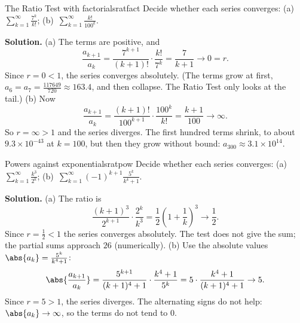 \documentclass[11pt]{article}
\begin{document}
\begin{exmp}{The Ratio Test with factorials}{ratfact}
Decide whether each series converges: (a)~$\displaystyle\sum_{k=1}^\infty\frac{7^k}{k!}$; \quad (b)~$\displaystyle\sum_{k=1}^\infty\frac{k!}{100^k}$.

\textbf{Solution.} (a) The terms are positive, and
\[
\frac{a_{k+1}}{a_k}=\frac{7^{k+1}}{(k+1)!}\cdot\frac{k!}{7^k}=\frac7{k+1}\to0=r .
\]
Since $r=0<1$, the series converges absolutely. (The terms grow at first, $a_6=a_7=\frac{117649}{720}\approx163.4$, and then collapse. The Ratio Test only looks at the tail.)
(b) Now
\[
\frac{a_{k+1}}{a_k}=\frac{(k+1)!}{100^{k+1}}\cdot\frac{100^k}{k!}=\frac{k+1}{100}\to\infty .
\]
So $r=\infty>1$ and the series diverges. The first hundred terms shrink, to about $9.3\times10^{-43}$ at $k=100$, but then they grow without bound: $a_{300}\approx3.1\times10^{14}$.
\end{exmp}

\begin{exmp}{Powers against exponentials}{ratpow}
Decide whether each series converges: (a)~$\displaystyle\sum_{k=1}^\infty\frac{k^3}{2^k}$; \quad (b)~$\displaystyle\sum_{k=1}^\infty(-1)^{k+1}\frac{5^k}{k^4+1}$.

\textbf{Solution.} (a) The ratio is
\[
\frac{(k+1)^3}{2^{k+1}}\cdot\frac{2^k}{k^3}=\frac12\left(1+\frac1k\right)^3\to\frac12 .
\]
Since $r=\frac12<1$ the series converges absolutely. The test does not give the sum; the partial sums approach $26$ (numerically).
(b) Use the absolute values $\abs{a_k}=\frac{5^k}{k^4+1}$:
\[
\abs{\frac{a_{k+1}}{a_k}}=\frac{5^{k+1}}{(k+1)^4+1}\cdot\frac{k^4+1}{5^k}=5\cdot\frac{k^4+1}{(k+1)^4+1}\to5 .
\]
Since $r=5>1$, the series diverges. The alternating signs do not help: $\abs{a_k}\to\infty$, so the terms do not tend to $0$.
\end{exmp}
\end{document}
